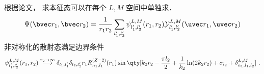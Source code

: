 
根据论文， 求本征态可以在每个 $L,M$ 空间中单独求．
\begin{equation}
\Psi(\bvec r_1, \bvec r_2) = \frac{1}{r_1 r_2}\sum_{l'_1, l'_2}  \psi_{l'_1, l'_2}^{L, M}(r_1, r_2)\mathcal{Y}_{l'_1, l'_2}^{L, M}(\uvec r_1, \uvec r_2)
\end{equation}
非对称化的散射态满足边界条件
\begin{equation}
\psi_{l'_1,l'_2}^{L, M}(r_1, r_2) \overset{r_2\to\infty}{\longrightarrow} \delta_{l_1,l'_1}\delta_{l_2,l'_2} r_1 R_{n_1,l_1}^{(Z=2)}(r_1)
\sin\qty[k_2 r_2 - \frac{\pi l_2}{2} +\frac{1}{k_2}\ln(2k_2 r_2) + \sigma_{l_2} + \delta_{n_1,l_1,l_2}^{L,M}]~.
\end{equation}
